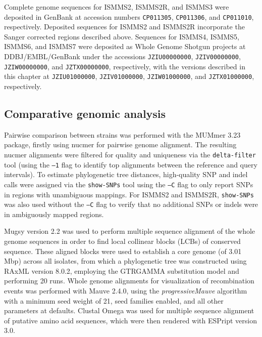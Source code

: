 Complete genome sequences for ISMMS2, ISMMS2R, and ISMMS3 were deposited in GenBank at accession numbers \texttt{CP011305}, \texttt{CP011306}, and \texttt{CP011010}, respectively. Deposited sequences for ISMMS2 and ISMMS2R incorporate the Sanger corrected regions described above. Sequences for ISMMS4, ISMMS5, ISMMS6, and ISMMS7 were deposited as Whole Genome Shotgun projects at DDBJ/EMBL/GenBank under the accessions \texttt{JZIU00000000}, \texttt{JZIV00000000}, \texttt{JZIW00000000}, and \texttt{JZTX00000000}, respectively, with the versions described in this chapter at \texttt{JZIU01000000}, \texttt{JZIV01000000}, \texttt{JZIW01000000}, and \texttt{JZTX01000000}, respectively.

\subsection{Comparative genomic analysis}

Pairwise comparison between strains was performed with the MUMmer 3.23 package,\autocite{Delcher2003} firstly using nucmer for pairwise genome alignment. The resulting nucmer alignments were filtered for quality and uniqueness via the \texttt{delta-filter} tool (using the \texttt{–1} flag to identify top alignments between the reference and query intervals). To estimate phylogenetic tree distances, high-quality SNP and indel calls were assigned via the \texttt{show-SNPs} tool using the \texttt{–C} flag to only report SNPs in regions with unambiguous mappings. For ISMMS2 and ISMMS2R, \texttt{show-SNPs} was also used without the \texttt{–C} flag to verify that no additional SNPs or indels were in ambiguously mapped regions.

Mugsy version 2.2 was used to perform multiple sequence alignment of the whole genome sequences in order to find local collinear blocks (LCBs) of conserved sequence.\autocite{Angiuoli2011} These aligned blocks were used to establish a core genome (of 3.01 Mbp) across all isolates, from which a phylogenetic tree was constructed using RAxML version 8.0.2,\autocite{Stamatakis2014} employing the GTRGAMMA substitution model and performing 20 runs. Whole genome alignments for visualization of recombination events was performed with Mauve 2.4.0,\autocite{Darling2004} using the \emph{progressiveMauve} algorithm\autocite{Darling2010} with a minimum seed weight of 21, seed families enabled, and all other parameters at defaults. Clustal Omega\autocite{Sievers2011} was used for multiple sequence alignment of putative amino acid sequences, which were then rendered with ESPript version 3.0.\autocite{Robert2014}

